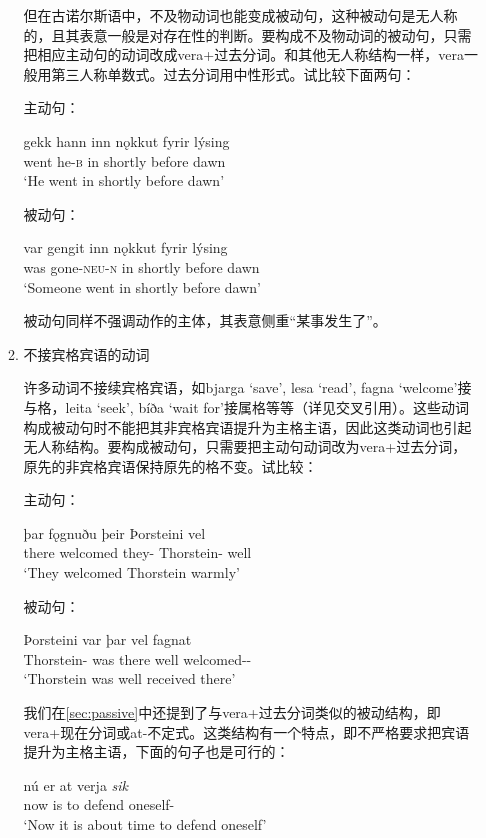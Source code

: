 \begin{enumerate}
\begin{enumerate}
但在古诺尔斯语中，不及物动词也能变成被动句，这种被动句是无人称的，且其表意一般是对存在性的判断。要构成不及物动词的被动句，只需把相应主动句的动词改成vera+过去分词。和其他无人称结构一样，vera一般用第三人称单数式。过去分词用中性形式。试比较下面两句：

主动句：
\begin{exe}
    \ex \gll
    gekk	hann	inn	nǫkkut	fyrir	lýsing\\
went	he-\textsc{b}	in	shortly	before	dawn\\
\trans `He went in shortly before dawn’
\end{exe}

被动句：
\begin{exe}
    \ex \gll
    var	gengit	inn	nǫkkut	fyrir	lýsing\\
was	gone-\textsc{\MakeLowercase{NEU-N}}	in	shortly	before	dawn\\
\trans `Someone went in shortly before dawn’
\end{exe}

被动句同样不强调动作的主体，其表意侧重“某事发生了”。
\item 不接宾格宾语的动词

许多动词不接续宾格宾语，如bjarga `save’, lesa `read’, fagna `welcome’接与格，leita `seek’, bíða `wait for’接属格等等（详见交叉引用）。这些动词构成被动句时不能把其非宾格宾语提升为主格主语，因此这类动词也引起无人称结构。要构成被动句，只需要把主动句动词改为vera+过去分词，原先的非宾格宾语保持原先的格不变。试比较：

主动句：
\begin{exe}
    \ex \gll
    þar	fǫgnuðu	þeir	Þorsteini	vel\\
there	welcomed	they-{\nom}	Thorstein-{\dat}	well\\
\trans `They welcomed Thorstein warmly’
\end{exe}

被动句：
\begin{exe}
\ex \gll
Þorsteini	var	þar	vel	fagnat\\
Thorstein-{\dat}	was	there	well	welcomed-{\neu}-{\nom}\\
\trans `Thorstein was well received there’
\end{exe}

我们在\ref{sec:passive}中还提到了与vera+过去分词类似的被动结构，即vera+现在分词或at-不定式。这类结构有一个特点，即不严格要求把宾语提升为主格主语，下面的句子也是可行的：
\begin{exe}
    \ex \gll
    nú	er	at	verja	\textit{sik}\\
now	is	to	defend	oneself-{\acc}\\
\trans `Now it is about time to defend oneself’
\end{exe}


\end{enumerate}
\end{enumerate}
